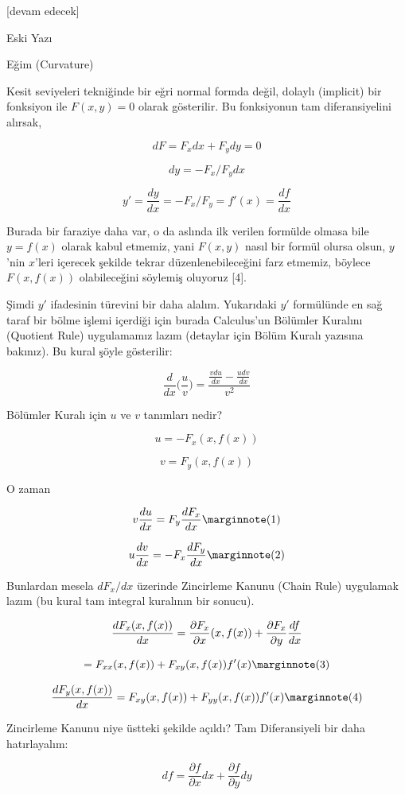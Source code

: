 \documentclass[12pt,fleqn]{article}\usepackage{../../common}
\begin{document}
[devam edecek]

Eski Yazı

Eğim (Curvature)

Kesit seviyeleri tekniğinde bir eğri normal formda değil, dolaylı
(implicit) bir fonksiyon ile $F(x,y) = 0$ olarak gösterilir. Bu fonksiyonun
tam diferansiyelini alırsak,

$$ dF = F_x dx + F_y dy = 0  $$

$$ dy = -F_x / F_y dx  $$

$$ y' = \frac{dy}{dx} = -F_x / F_y = f'(x) = \frac{df}{dx} $$

Burada bir faraziye daha var, o da aslında ilk verilen formülde olmasa bile
$y=f(x)$ olarak kabul etmemiz, yani $F(x,y)$ nasıl bir formül olursa olsun,
$y$'nin $x$'leri içerecek şekilde tekrar düzenlenebileceğini farz etmemiz,
böylece $F(x,f(x))$ olabileceğini söylemiş oluyoruz [4].

Şimdi $y'$ ifadesinin türevini bir daha alalım. Yukarıdaki $y'$ formülünde
en sağ taraf bir bölme işlemi içerdiği için burada Calculus'un Bölümler
Kuralını (Quotient Rule) uygulamamız lazım (detaylar için Bölüm Kuralı
yazısına bakınız). Bu kural şöyle gösterilir:

$$ \frac{d}{dx}\bigg(\frac{u}{v}\bigg) = 
\frac{\displaystyle \frac{v du}{dx} - \frac{u dv}{dx}}{v^2} $$

Bölümler Kuralı için $u$ ve $v$ tanımları nedir? 

$$ u = -F_x(x,f(x))  $$

$$ v = F_y(x,f(x)) $$

O zaman

$$ 
v \frac{du}{dx} = F_y \frac{dF_x}{dx} 
\mlabel{1}
$$

$$
u \frac{dv}{dx} = -F_x \frac{dF_y }{dx} 
\mlabel{2}
$$

Bunlardan mesela $dF_x/dx$ üzerinde Zincirleme Kanunu (Chain Rule) uygulamak
lazım (bu kural tam integral kuralının bir sonucu). 

$$ \frac{d F_x(x,f(x)) }{dx} = \frac{\partial F_x}{\partial  x}(x,f(x))+\frac{\partial F_x}{\partial y}\frac{df}{dx}\\ $$

$$
= F_{xx}(x,f(x))+F_{xy}(x,f(x))f'(x) 
\mlabel{3}
$$

$$
\frac{d F_y(x,f(x)) }{dx} =  F_{xy}(x,f(x))+F_{yy}(x,f(x))f'(x) 
\mlabel{4}
$$

Zincirleme Kanunu niye üstteki şekilde açıldı? Tam Diferansiyeli bir daha
hatırlayalım:

$$ df = \frac{\partial f}{\partial x} dx + \frac{\partial f}{\partial y} dy  $$
\end{document}
